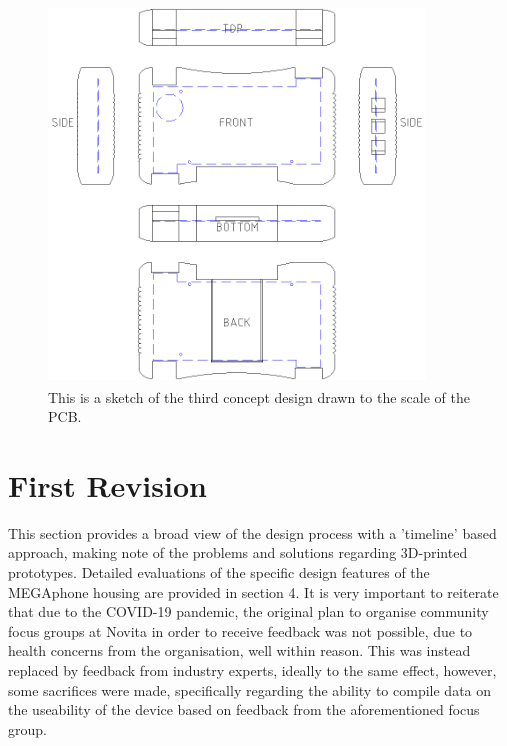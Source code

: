 \begin{figure} [h]
\centering
\includegraphics[width=10cm,height=10cm,keepaspectratio]{Figures/design3_sketch.png}
\caption{This is a sketch of the third concept design drawn to the scale of the PCB.}
\label{fig:Design_3}
\end{figure}

\section{First Revision}

This section provides a broad view of the design process with a 'timeline' based approach, making note of the problems and solutions regarding 3D-printed prototypes.
Detailed evaluations of the specific design features of the MEGAphone housing are provided in section 4.
It is very important to reiterate that due to the COVID-19 pandemic, the original plan to organise community focus groups at Novita \cite{novita} in order to receive feedback was not possible, due to health concerns from the organisation, well within reason.
This was instead replaced by feedback from industry experts, ideally to the same effect, however, some sacrifices were made, specifically regarding the ability to compile data on the useability of the device based on feedback from the aforementioned focus group.

